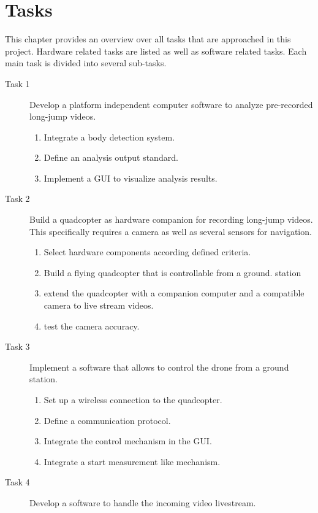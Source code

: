 \graphicspath{{./figures/}}
\chapter{Tasks}
This chapter provides an overview over all tasks that are approached in this
project.
Hardware related tasks are listed as well as software related tasks.
Each main task is divided into several sub-tasks.

\begin{description}
    \item[Task 1] Develop a platform independent computer software to analyze 
    pre-recorded long-jump videos.
    \begin{enumerate}
        \item Integrate a body detection system.
        \item Define an analysis output standard.
        \item Implement a \acs*{GUI} to visualize analysis results.
    \end{enumerate}
    \item[Task 2] Build a quadcopter as hardware companion for recording 
    long-jump videos. This specifically requires a camera as well as several
    sensors for navigation.
    \begin{enumerate}
        \item Select hardware components according defined criteria.
        \item Build a flying quadcopter that is controllable from a ground.
        station
        \item extend the quadcopter with a companion computer and a compatible
        camera to live stream videos.
        \item test the camera accuracy.
    \end{enumerate}
    \item[Task 3] Implement a software that allows to control the drone from a
    ground station.
    \begin{enumerate}
        \item Set up a wireless connection to the quadcopter.
        \item Define a communication protocol.
        \item Integrate the control mechanism in the \acs*{GUI}.
        \item Integrate a start measurement like mechanism.
    \end{enumerate}
    \item[Task 4] Develop a software to handle the incoming video livestream.

\end{description}
